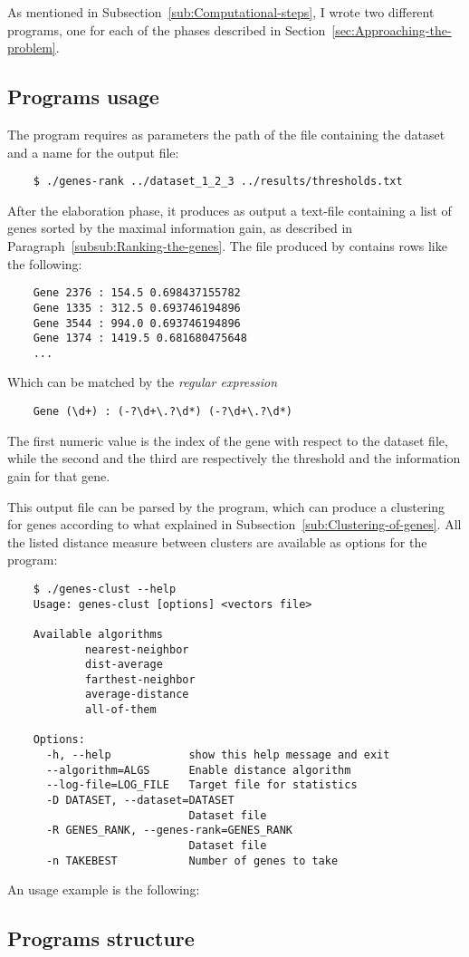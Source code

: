 As mentioned in Subsection~\ref{sub:Computational-steps}, I wrote two
different programs, one for each of the phases described in
Section~\ref{sec:Approaching-the-problem}.

\subsection{ Programs usage }

    The program  requires as parameters the path
    of the file containing the dataset and a name for the output file:
    \begin{verbatim}
    $ ./genes-rank ../dataset_1_2_3 ../results/thresholds.txt
    \end{verbatim}

    After the elaboration phase, it produces as output a text-file
    containing a list of genes sorted by the maximal information gain, as
    described in Paragraph~\ref{subsub:Ranking-the-genes}. The file
    produced by  contains rows like the following:
    \begin{verbatim}
    Gene 2376 : 154.5 0.698437155782
    Gene 1335 : 312.5 0.693746194896
    Gene 3544 : 994.0 0.693746194896
    Gene 1374 : 1419.5 0.681680475648
    ...
    \end{verbatim}

    Which can be matched by the \emph{regular expression}
    \begin{verbatim}
    Gene (\d+) : (-?\d+\.?\d*) (-?\d+\.?\d*)
    \end{verbatim}

    The first numeric value is the index of the gene with respect to the
    dataset file, while the second and the third are respectively the
    threshold and the information gain for that gene.

    This output file can be parsed by the  program,
    which can produce a clustering for genes according to what explained
    in Subsection~\ref{sub:Clustering-of-genes}. All the listed distance
    measure between clusters are available as options for the program:
    \begin{verbatim}
    $ ./genes-clust --help
    Usage: genes-clust [options] <vectors file>

    Available algorithms
            nearest-neighbor
            dist-average
            farthest-neighbor
            average-distance
            all-of-them

    Options:
      -h, --help            show this help message and exit
      --algorithm=ALGS      Enable distance algorithm
      --log-file=LOG_FILE   Target file for statistics
      -D DATASET, --dataset=DATASET
                            Dataset file
      -R GENES_RANK, --genes-rank=GENES_RANK
                            Dataset file
      -n TAKEBEST           Number of genes to take
    \end{verbatim}

    An usage example is the following:

\subsection{ Programs structure }

